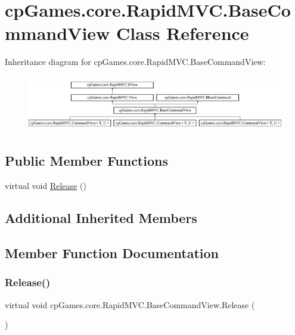 \hypertarget{classcp_games_1_1core_1_1_rapid_m_v_c_1_1_base_command_view}{}\section{cp\+Games.\+core.\+Rapid\+M\+V\+C.\+Base\+Command\+View Class Reference}
\label{classcp_games_1_1core_1_1_rapid_m_v_c_1_1_base_command_view}
Inheritance diagram for cp\+Games.\+core.\+Rapid\+M\+V\+C.\+Base\+Command\+View\+:\begin{figure}[H]
\begin{center}
\leavevmode
\includegraphics[height=2.472406cm]{classcp_games_1_1core_1_1_rapid_m_v_c_1_1_base_command_view}
\end{center}
\end{figure}
\subsection*{Public Member Functions}
\begin{DoxyCompactItemize}
\item 
virtual void \mbox{\hyperlink{classcp_games_1_1core_1_1_rapid_m_v_c_1_1_base_command_view_af5c36b96f3c29382b3809bd0c25130c3}{Release}} ()
\end{DoxyCompactItemize}
\subsection*{Additional Inherited Members}


\subsection{Member Function Documentation}
\mbox{\label{classcp_games_1_1core_1_1_rapid_m_v_c_1_1_base_command_view_af5c36b96f3c29382b3809bd0c25130c3}} 
\subsubsection{\texorpdfstring{Release()}{Release()}}
{\footnotesize\ttfamily virtual void cp\+Games.\+core.\+Rapid\+M\+V\+C.\+Base\+Command\+View.\+Release (\begin{DoxyParamCaption}{ }\end{DoxyParamCaption})\hspace{0.3cm}{\ttfamily [virtual]}}



